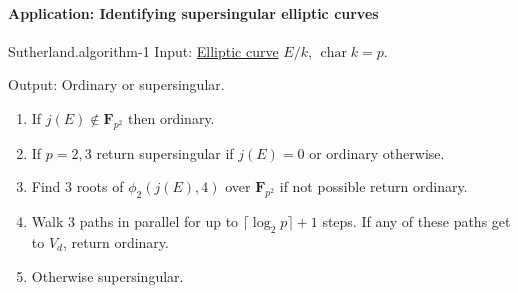 \documentclass[10pt,]{book}
\numberwithin{equation}{section}
\newcommand{\FF}{\mathbf{F}}
\DeclareMathOperator{\characteristic}{char}
\begin{document}
\paragraph[{Application: Identifying supersingular elliptic curves}]{Application: Identifying supersingular elliptic curves}\hypertarget{paragraphs-29}{}
\begin{algorithm}{Sutherland.}{}{algorithm-1}%
\hypertarget{p-819}{}%
Input: \hyperref[def-supersing-isog-ec]{Elliptic curve} \(E/k\), \(\characteristic k = p\).%
\par
\hypertarget{p-820}{}%
Output: Ordinary or supersingular.%
\par
\hypertarget{p-821}{}%
\leavevmode%
\begin{enumerate}
\item\hypertarget{li-206}{}If \(j(E) \not \in \FF_{p^2}\) then ordinary.%
\item\hypertarget{li-207}{}If \(p  =2,3\) return supersingular if \(j(E) = 0\) or ordinary otherwise.%
\item\hypertarget{li-208}{}Find 3 roots of \(\phi_2(j(E), 4)\) over \(\FF_{p^2}\) if not possible return ordinary.%
\item\hypertarget{li-209}{}Walk 3 paths in parallel for up to \(\lceil \log_2 p \rceil + 1 \) steps. If any of these paths get to \(V_d\), return ordinary.%
\item\hypertarget{li-210}{}Otherwise supersingular.%
\end{enumerate}
%
\end{algorithm}
%
\backmatter
%
%
%
%
%
\typeout{************************************************}
\typeout{************************************************}
%
\end{document}
